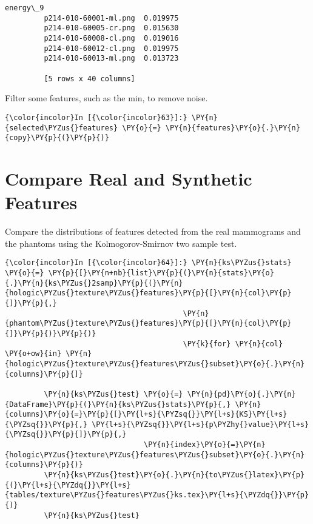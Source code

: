 \begin{Verbatim}[commandchars=\\\{\}]
                                energy\_9
         p214-010-60001-ml.png  0.019975
         p214-010-60005-cr.png  0.015630
         p214-010-60008-cl.png  0.019016
         p214-010-60012-cl.png  0.019975
         p214-010-60013-ml.png  0.013723

         [5 rows x 40 columns]
\end{Verbatim}

    Filter some features, such as the min, to remove noise.

    \begin{Verbatim}[commandchars=\\\{\}]
{\color{incolor}In [{\color{incolor}63}]:} \PY{n}{selected\PYZus{}features} \PY{o}{=} \PY{n}{features}\PY{o}{.}\PY{n}{copy}\PY{p}{(}\PY{p}{)}
\end{Verbatim}

    \section{Compare Real and Synthetic
Features}\label{compare-real-and-synthetic-features}

    Compare the distributions of features detected from the real mammograms
and the phantoms using the Kolmogorov-Smirnov two sample test.

    \begin{Verbatim}[commandchars=\\\{\}]
{\color{incolor}In [{\color{incolor}64}]:} \PY{n}{ks\PYZus{}stats} \PY{o}{=} \PY{p}{[}\PY{n+nb}{list}\PY{p}{(}\PY{n}{stats}\PY{o}{.}\PY{n}{ks\PYZus{}2samp}\PY{p}{(}\PY{n}{hologic\PYZus{}texture\PYZus{}features}\PY{p}{[}\PY{n}{col}\PY{p}{]}\PY{p}{,}
                                         \PY{n}{phantom\PYZus{}texture\PYZus{}features}\PY{p}{[}\PY{n}{col}\PY{p}{]}\PY{p}{)}\PY{p}{)}
                                         \PY{k}{for} \PY{n}{col} \PY{o+ow}{in} \PY{n}{hologic\PYZus{}texture\PYZus{}features\PYZus{}subset}\PY{o}{.}\PY{n}{columns}\PY{p}{]}

         \PY{n}{ks\PYZus{}test} \PY{o}{=} \PY{n}{pd}\PY{o}{.}\PY{n}{DataFrame}\PY{p}{(}\PY{n}{ks\PYZus{}stats}\PY{p}{,} \PY{n}{columns}\PY{o}{=}\PY{p}{[}\PY{l+s}{\PYZsq{}}\PY{l+s}{KS}\PY{l+s}{\PYZsq{}}\PY{p}{,} \PY{l+s}{\PYZsq{}}\PY{l+s}{p\PYZhy{}value}\PY{l+s}{\PYZsq{}}\PY{p}{]}\PY{p}{,}
                                \PY{n}{index}\PY{o}{=}\PY{n}{hologic\PYZus{}texture\PYZus{}features\PYZus{}subset}\PY{o}{.}\PY{n}{columns}\PY{p}{)}
         \PY{n}{ks\PYZus{}test}\PY{o}{.}\PY{n}{to\PYZus{}latex}\PY{p}{(}\PY{l+s}{\PYZdq{}}\PY{l+s}{tables/texture\PYZus{}features\PYZus{}ks.tex}\PY{l+s}{\PYZdq{}}\PY{p}{)}
         \PY{n}{ks\PYZus{}test}
\end{Verbatim}

